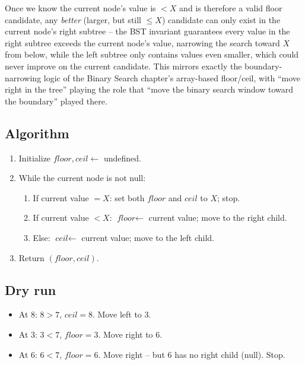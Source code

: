 Once we know the current node's value is $<X$ and is therefore a valid
floor candidate, any \emph{better} (larger, but still $\le X$) candidate
can only exist in the current node's right subtree -- the BST invariant
guarantees every value in the right subtree exceeds the current node's
value, narrowing the search toward $X$ from below, while the left subtree
only contains values even smaller, which could never improve on the
current candidate. This mirrors exactly the boundary-narrowing logic of
the Binary Search chapter's array-based floor/ceil, with ``move
right in the tree'' playing the role that ``move the binary search window
toward the boundary'' played there.

\subsection*{Algorithm}

\begin{enumerate}
  \item Initialize $\textit{floor}, \textit{ceil} \gets$ undefined.
  \item While the current node is not null:
  \begin{enumerate}
    \item If current value $=X$: set both $\textit{floor}$ and
          $\textit{ceil}$ to $X$; stop.
    \item If current value $<X$: $\textit{floor} \gets$ current value;
          move to the right child.
    \item Else: $\textit{ceil} \gets$ current value; move to the left
          child.
  \end{enumerate}
  \item Return $(\textit{floor}, \textit{ceil})$.
\end{enumerate}

\subsection*{Dry run}


\begin{itemize}
  \item At $8$: $8>7$, $\textit{ceil}=8$. Move left to $3$.
  \item At $3$: $3<7$, $\textit{floor}=3$. Move right to $6$.
  \item At $6$: $6<7$, $\textit{floor}=6$. Move right -- but $6$ has no
        right child (null). Stop.
\end{itemize}

